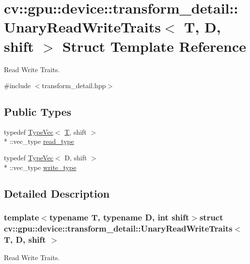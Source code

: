 \hypertarget{structcv_1_1gpu_1_1device_1_1transform__detail_1_1UnaryReadWriteTraits}{\section{cv\-:\-:gpu\-:\-:device\-:\-:transform\-\_\-detail\-:\-:Unary\-Read\-Write\-Traits$<$ T, D, shift $>$ Struct Template Reference}
\label{structcv_1_1gpu_1_1device_1_1transform__detail_1_1UnaryReadWriteTraits}
}


Read Write Traits.  




{\ttfamily \#include $<$transform\-\_\-detail.\-hpp$>$}

\subsection*{Public Types}
\begin{DoxyCompactItemize}
\item 
typedef \hyperlink{structcv_1_1gpu_1_1device_1_1TypeVec}{Type\-Vec}$<$ \hyperlink{calib3d_8hpp_a3efb9551a871ddd0463079a808916717}{T}, shift $>$\\*
\-::vec\-\_\-type \hyperlink{structcv_1_1gpu_1_1device_1_1transform__detail_1_1UnaryReadWriteTraits_a2319c756d4282dfdbbe2ee92d0457ad1}{read\-\_\-type}
\item 
typedef \hyperlink{structcv_1_1gpu_1_1device_1_1TypeVec}{Type\-Vec}$<$ D, shift $>$\\*
\-::vec\-\_\-type \hyperlink{structcv_1_1gpu_1_1device_1_1transform__detail_1_1UnaryReadWriteTraits_a5b420557d7aec765bee780f4510afc2b}{write\-\_\-type}
\end{DoxyCompactItemize}


\subsection{Detailed Description}
\subsubsection*{template$<$typename T, typename D, int shift$>$struct cv\-::gpu\-::device\-::transform\-\_\-detail\-::\-Unary\-Read\-Write\-Traits$<$ T, D, shift $>$}

Read Write Traits. 

